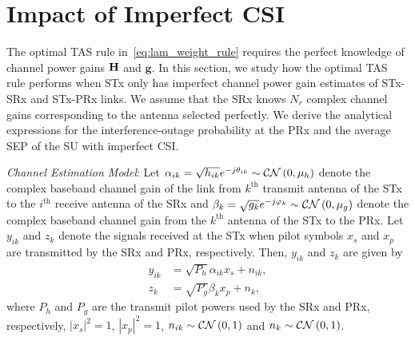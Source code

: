 \documentclass[12pt,draftcls,peerreview,onecolumn]{IEEEtran}
\newcommand{\CN}{{\cal CN}}
\newcommand{\mtx}[1]{{\bf #1}} %
\newcommand{\mug}{{\mu_{g}}}
\newcommand{\muh}{{\mu_{h}}}
\newcommand{\Nr}{{N_r}}
\newcommand{\such}{h}
\newcommand{\puch}{g}
\newcommand{\hk}[1]{{\such_{#1}}}
\newcommand{\gk}[1]{{\puch_{#1}}}
\newcommand{\g}{\mathbf{\puch}}
\newcommand{\suchph}{\theta}
\newcommand{\puchph}{\varphi}
\newcommand{\Hmx}{\mtx{H}}
\newcommand{\ith}{i^{\text{th}}}
\newcommand{\kth}{k^{\text{th}}}
\newcommand{\sug}{\alpha}
\newcommand{\pug}{\beta}
\newcommand{\sugain}[1]{\sug_{#1}}
\newcommand{\pugain}[1]{\pug_{#1}}
\newcommand{\gpilotpower}{P_g}
\newcommand{\hpilotpower}{P_h}
\newcommand{\hpilotsym}{x_{s}}
\newcommand{\gpilotsym}{x_{p}}
\newcommand{\hpilotrcv}{y_{ik}}
\newcommand{\gpilotrcv}{z_{k}}
\newcommand{\hpilotnoise}{n_{ik}}
\newcommand{\gpilotnoise}{n_{k}}
\begin{document}
\section{Impact of Imperfect CSI}
\label{sec:imperfectcsi}
The optimal TAS rule in~\eqref{eq:lam_weight_rule} requires the perfect knowledge of channel power gains $\Hmx$ and $\g$. In this section, we study how the optimal TAS rule performs when STx only has imperfect channel power gain estimates of STx-SRx and STx-PRx links. We assume that the SRx knows $\Nr$  complex channel gains corresponding to the antenna selected perfectly. We derive the analytical expressions for the interference-outage probability at the PRx and the average SEP of the SU with imperfect CSI. 


{\em Channel Estimation Model}: Let $\sugain{ik} = \sqrt{\hk{ik}}e^{-j\suchph_{ik}}\sim\CN\left(0,\muh\right) $ denote the complex baseband channel gain of the link from $\kth$ transmit antenna of the STx to the $\ith$ receive antenna of the SRx and $\pugain{k} = \sqrt{\gk{k}}e^{-j\puchph_{k}}\sim\CN\left(0,\mug\right)$ denote the complex baseband channel gain from the $\kth$ antenna of the STx to the PRx.  Let $\hpilotrcv$ and $\gpilotrcv$ denote the signals received at the STx when pilot symbols $\hpilotsym$ and $\gpilotsym$ are transmitted by the SRx and PRx, respectively. Then, $\hpilotrcv$ and $\gpilotrcv$ are given by  
\begin{align}
\label{eq:yhat_su}
\hpilotrcv & = \sqrt{\hpilotpower} \sugain{ik} \hpilotsym  + \hpilotnoise, \\
\label{eq:yhat_pu}
\gpilotrcv & = \sqrt{\gpilotpower} \pugain{k} \gpilotsym  + \gpilotnoise, 
\end{align}
where $\hpilotpower$ and $\gpilotpower$ are the transmit pilot powers used by the SRx and PRx, respectively, $|\hpilotsym|^2=1$, $|\gpilotsym|^2=1$, $\hpilotnoise \sim\CN\left(0,1\right) $ and $\gpilotnoise\sim \CN\left(0,1 \right) $. 
\end{document}
